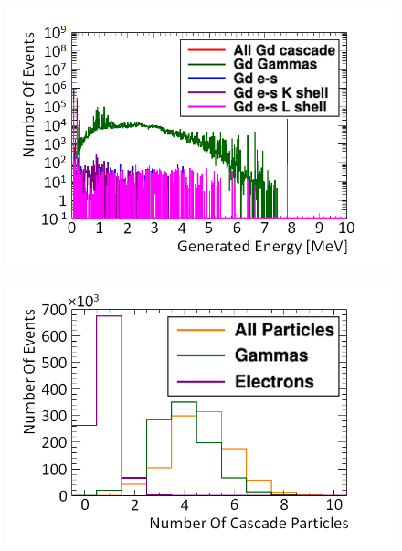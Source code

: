 \begin{figure}[!h]
\centering
\begin{minipage}{.45\textwidth}
  \centering
  \includegraphics[width=\linewidth]{Chapter4/Figs/Raster/gadolinium/gadoliniumEnergiesCascadeMedText.png}
  \label{fig:gadoliniumEnergiesCascade}
\end{minipage}%
\qquad
\begin{minipage}{.45\textwidth}
  \centering
  \includegraphics[width=\linewidth]{Chapter4/Figs/Raster/gadolinium/gadoliniumMultipliciesBreakdownCascadeMedText.png} 
  \label{fig:gadoliniumMultipliciesBreakdownCascade}
\end{minipage}
\end{figure}

